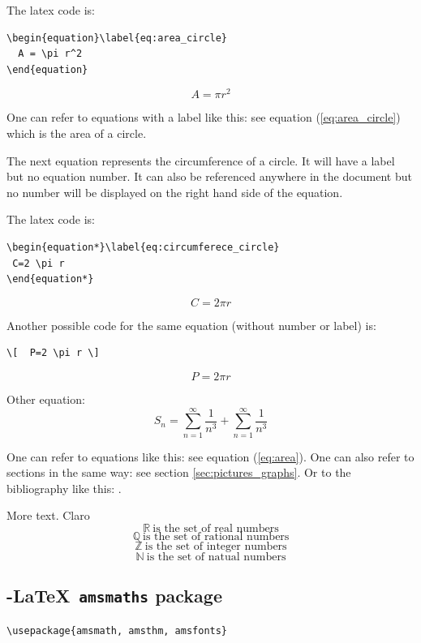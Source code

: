 \documentclass[12pt,a4paper]{article}
\theoremstyle{definition}
\theoremstyle{remark}
\def\RR{\mathbb{R}}
\def\ZZ{\mathbb{Z}}
\def\QQ{\mathbb{Q}}
\def\NN{\mathbb{N}}
\begin{document}
The latex code is:
\begin{verbatim}
\begin{equation}\label{eq:area_circle}
  A = \pi r^2  
\end{equation}
\end{verbatim}

\begin{equation}\label{eq:area_circle}
  A = \pi r^2  
\end{equation}

One can refer to equations with a label like this: see equation (\ref{eq:area_circle}) which is the area of a circle.

The next equation represents the circumference of a circle. It will have a label but no equation number. It can also be referenced anywhere in the document but no number will be displayed on the right hand side of the equation.

The latex code is:
\begin{verbatim}
\begin{equation*}\label{eq:circumferece_circle}
 C=2 \pi r
\end{equation*}
\end{verbatim}

\begin{equation*}\label{eq:circumferece_circle}
 C=2 \pi r
\end{equation*}
 
 Another possible code for the same equation (without number or label) is:
 \begin{verbatim}
\[  P=2 \pi r \]
\end{verbatim}

\[  P=2 \pi r \]

Other equation:
\[
S_n = \sum_{n=1}^{\infty} \frac{1}{n^3} + \sum_{n=1}^{\infty} \frac{1}{n^3}
\] 

One can refer to equations like this: see equation (\ref{eq:area}). One can also
refer to sections in the same way: see section \ref{sec:pictures_graphs}. Or
to the bibliography like this: \cite{Cd94}.

More text. Claro 
\noindent
\[\RR\ \text{is the set of real numbers}\]
\[\QQ\ \text{is the set of rational numbers}\]
\[\ZZ\ \text{is the set of integer numbers}\]
\[\NN\ \text{is the set of natual numbers}\]



\subsection{\AmS-\LaTeX \texttt{ amsmaths} package}\label{sec:nothing}
\begin{verbatim}
\usepackage{amsmath, amsthm, amsfonts}
\end{verbatim}
\end{document}
